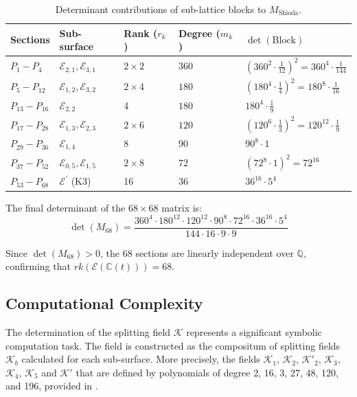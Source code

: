 \documentclass[11pt]{amsart}
\newcommand{\KK}{{\mathcal K}}
\numberwithin{equation}{section}
\numberwithin{table}{section}
\newcommand\<{\langle}
\begin{document}
\begin{table}[h!]
	\centering
	\begin{tabular}{@{}lllll@{}}
		\toprule
		Sections & Sub-surface & Rank ($r_k$) & Degree ($m_k$) & $\det(\text{Block})$ \\ \midrule
		$P_1 - P_4$ & $\mathcal{E}_{2,1}, \mathcal{E}_{3,1}$ & $2 \times 2$ & $360$ & $(360^2 \cdot \frac{1}{12})^2 = 360^4 \cdot \frac{1}{144}$ \\
		$P_5 - P_{12}$ & $\mathcal{E}_{1,2}, \mathcal{E}_{3,2}$ & $2 \times 4$ & $180$ & $(180^4 \cdot \frac{1}{4})^2 = 180^8 \cdot \frac{1}{16}$ \\
		$P_{13} - P_{16}$ & $\mathcal{E}_{2,2}$ & 4 & $180$ & $180^4 \cdot \frac{1}{9}$ \\
		$P_{17} - P_{28}$ & $\mathcal{E}_{1,3}, \mathcal{E}_{2,3}$ & $2 \times 6$ & $120$ & $(120^6 \cdot \frac{1}{3})^2 = 120^{12} \cdot \frac{1}{9}$ \\
		$P_{29} - P_{36}$ & $\mathcal{E}_{1,4}$ & 8 & $90$ & $90^8 \cdot 1$ \\
		$P_{37} - P_{52}$ & $\mathcal{E}_{0,5}, \mathcal{E}_{1,5}$ & $2 \times 8$ & $72$ & $(72^8 \cdot 1)^2 = 72^{16}$ \\
		$P_{53} - P_{68}$ & $\mathcal{E}^{\prime}$ (K3) & 16 & $36$ & $36^{16} \cdot 5^4$ \\ \bottomrule
	\end{tabular}
	\caption{Determinant contributions of sub-lattice blocks to $M_{\text{Shioda}}$.}
\end{table}

The final determinant of the $68 \times 68$ matrix is:
\begin{equation}
	\det(M_{68}) = \frac{360^4 \cdot 180^{12} \cdot 120^{12} \cdot 90^8 \cdot 72^{16} \cdot 36^{16} \cdot 5^4}{144 \cdot 16 \cdot 9 \cdot 9}
\end{equation}

Since $\det(M_{68}) > 0$, the 68 sections are linearly independent over $\mathbb{Q}$, confirming that $rk(\mathcal{E}(\mathbb{C}(t))) = 68$.

	\subsection{Computational Complexity}

The determination of the splitting field $\mathcal{K}$ represents a significant symbolic computation task. The field is constructed as the compositum of splitting fields $\mathcal{K}_b$ calculated for each sub-surface. 
More precisely,  the fields $\KK_1$,  $\KK_2$,  $\KK'_2$, $\KK_3$, $\KK_4$, $\KK_5$ and $\KK'$ that are defined by polynomials of degree 2, 16, 3, 27, 48, 120, and 196, provided in \cite[Gp-360]{Shioda360-Codes}.
\end{document}
